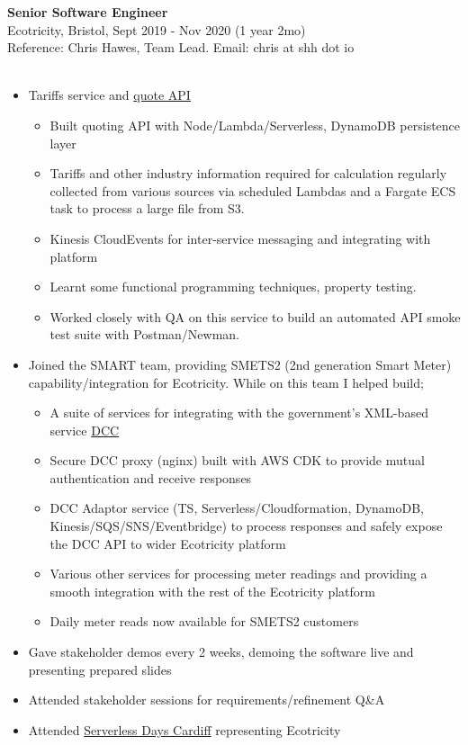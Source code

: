 \documentclass[overlap, line, 10pt]{res} %
\begin{document}
\begin{resume}
\textbf{Senior Software Engineer}\\
Ecotricity, Bristol, Sept 2019 - Nov 2020 (1 year 2mo) \\
Reference: Chris Hawes, Team Lead. Email: chris at shh dot io\\\\
\begin{itemize} \itemsep -1pt
\item Tariffs service and \href{https://join.ecotricity.co.uk/for-your-home/quote-and-switch}{quote API}
\begin{itemize} \itemsep -1pt
\item Built quoting API with Node/Lambda/Serverless, DynamoDB persistence layer
\item Tariffs and other industry information required for calculation regularly collected from various sources via scheduled Lambdas and a Fargate ECS task to process a large file from S3.
\item Kinesis CloudEvents for inter-service messaging and integrating with platform
\item Learnt some functional programming techniques, property testing.
\item Worked closely with QA on this service to build an automated API smoke test suite with Postman/Newman.
\end{itemize}
\item Joined the SMART team, providing SMETS2 (2nd generation Smart Meter) capability/integration for Ecotricity. While on this team I helped build; 
\begin{itemize}
\item A suite of services for integrating with the government's XML-based service \href{https://www.smartdcc.co.uk/}{DCC} 
\item Secure DCC proxy (nginx) built with AWS CDK to provide mutual authentication and receive responses
\item DCC Adaptor service (TS, Serverless/Cloudformation, DynamoDB, Kinesis/SQS/SNS/Eventbridge) to process responses and safely expose the DCC API to wider Ecotricity platform
\item Various other services for processing meter readings and providing a smooth integration with the rest of the Ecotricity platform
\item Daily meter reads now available for SMETS2 customers
\end{itemize}
\item Gave stakeholder demos every 2 weeks, demoing the software live and presenting prepared slides
\item Attended stakeholder sessions for requirements/refinement Q\&A
\item Attended \href{https://cardiff.serverlessdays.io/}{Serverless Days Cardiff} representing Ecotricity
\end{itemize}



\end{resume}
\end{document}
